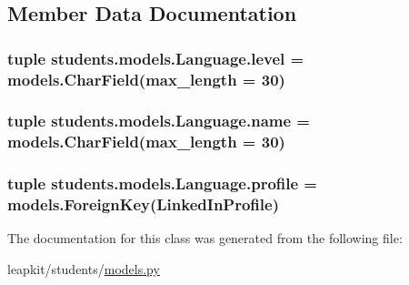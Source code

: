 \subsection{Member Data Documentation}
\hypertarget{classstudents_1_1models_1_1_language_affd66c68817bac13ece99da9eca10101}{
\subsubsection[{level}]{\setlength{\rightskip}{0pt plus 5cm}tuple students.\-models.\-Language.\-level = models.\-Char\-Field(max\-\_\-length = 30)\hspace{0.3cm}{\ttfamily [static]}}}\label{classstudents_1_1models_1_1_language_affd66c68817bac13ece99da9eca10101}
\hypertarget{classstudents_1_1models_1_1_language_ac37164d4a1b3ac7c31546adfe1dd18d5}{
\subsubsection[{name}]{\setlength{\rightskip}{0pt plus 5cm}tuple students.\-models.\-Language.\-name = models.\-Char\-Field(max\-\_\-length = 30)\hspace{0.3cm}{\ttfamily [static]}}}\label{classstudents_1_1models_1_1_language_ac37164d4a1b3ac7c31546adfe1dd18d5}
\hypertarget{classstudents_1_1models_1_1_language_ab9c9571762a4e0df5dda38d8ad451c3d}{
\subsubsection[{profile}]{\setlength{\rightskip}{0pt plus 5cm}tuple students.\-models.\-Language.\-profile = models.\-Foreign\-Key({\bf Linked\-In\-Profile})\hspace{0.3cm}{\ttfamily [static]}}}\label{classstudents_1_1models_1_1_language_ab9c9571762a4e0df5dda38d8ad451c3d}


The documentation for this class was generated from the following file\-:\begin{DoxyCompactItemize}
\item 
leapkit/students/\hyperlink{models_8py}{models.\-py}\end{DoxyCompactItemize}
